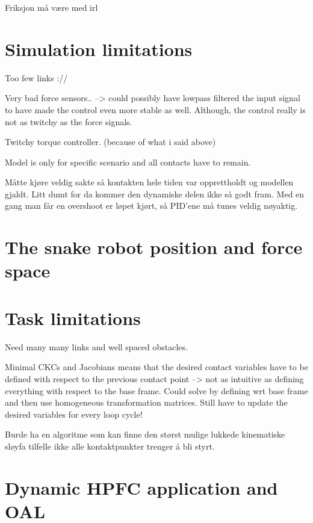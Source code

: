 Friksjon må være med irl

\section{Simulation limitations}

Too few links ://

Very bad force sensors.. --> could possibly have lowpass filtered the input signal to have made the control even more stable as well. Although, the control really is not as twitchy as the force signals.

Twitchy torque controller. (because of what i said above)

Model is only for specific scenario and all contacts have to remain.

Måtte kjøre veldig sakte så kontakten hele tiden var opprettholdt og modellen gjaldt. Litt dumt for da kommer den dynamiske delen ikke så godt fram.
Med en gang man får en overshoot er løpet kjørt, så PID'ene må tunes veldig nøyaktig.

\section{The snake robot position and force space}

\section{Task limitations}

Need many many links and well spaced obstacles.

Minimal CKCs and Jacobians means that the desired contact variables have to be defined with respect to the previous contact point --> not as intuitive as defining everything with respect to the base frame. Could solve by defining wrt base frame and then use homogeneous transformation matrices. Still have to update the desired variables for every loop cycle!

Burde ha en algoritme som kan finne den størst mulige lukkede kinematiske sløyfa tilfelle ikke alle kontaktpunkter trenger å bli styrt.

\section{Dynamic HPFC application and OAL}